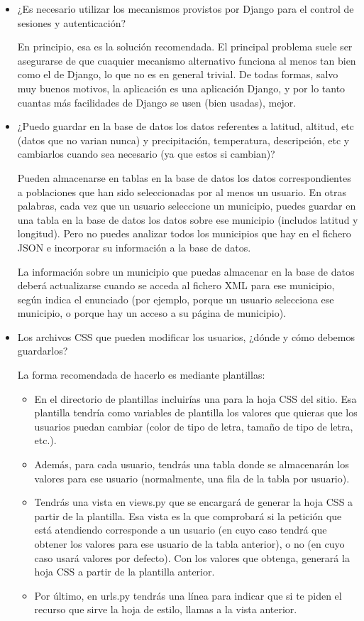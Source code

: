 \begin{itemize}
\item ¿Es necesario utilizar los mecanismos provistos por Django para el control de sesiones y autenticación?

  En principio, esa es la solución recomendada. El principal problema suele ser asegurarse de que cuaquier mecanismo alternativo funciona al menos tan bien como el de Django, lo que no es en general trivial. De todas formas, salvo muy buenos motivos, la aplicación es una aplicación Django, y por lo tanto cuantas más facilidades de Django se usen (bien usadas), mejor.
  
\item ¿Puedo guardar en la base de datos los datos referentes a latitud, altitud, etc (datos que no varian nunca) y precipitación, temperatura, descripción, etc y cambiarlos cuando sea necesario (ya que estos si cambian)?

  Pueden almacenarse en tablas en la base de datos los datos correspondientes a poblaciones que han sido seleccionadas por al menos un usuario. En otras palabras, cada vez que un usuario seleccione un municipio, puedes guardar en una tabla en la base de datos los datos sobre ese municipio (includos latitud y longitud). Pero no puedes analizar todos los municipios que hay en el fichero JSON e incorporar su información a la base de datos.

  La información sobre un municipio que puedas almacenar en la base de datos deberá actualizarse cuando se acceda al fichero XML para ese municipio, según indica el enunciado (por ejemplo, porque un usuario selecciona ese municipio, o porque hay un acceso a su página de municipio).

\item Los archivos CSS que pueden modificar los usuarios, ¿dónde y cómo debemos guardarlos?

  La forma recomendada de hacerlo es mediante plantillas:

  \begin{itemize}
  \item En el directorio de plantillas incluirías una para la hoja CSS del sitio. Esa plantilla tendría como variables de plantilla los valores que quieras que los usuarios puedan cambiar (color de tipo de letra, tamaño de tipo de letra, etc.).
  \item Además, para cada usuario, tendrás una tabla donde se almacenarán los valores para ese usuario (normalmente, una fila de la tabla por usuario).
  \item Tendrás una vista en views.py que se encargará de generar la hoja CSS a partir de la plantilla. Esa vista es la que comprobará si la petición que está atendiendo corresponde a un usuario (en cuyo caso tendrá que obtener los valores para ese usuario de la tabla anterior), o no (en cuyo caso usará valores por defecto). Con los valores que obtenga, generará la hoja CSS a partir de la plantilla anterior.
  \item Por último, en urls.py tendrás una línea para indicar que si te piden el recurso que sirve la hoja de estilo, llamas a la vista anterior.
  \end{itemize}


\end{itemize}
